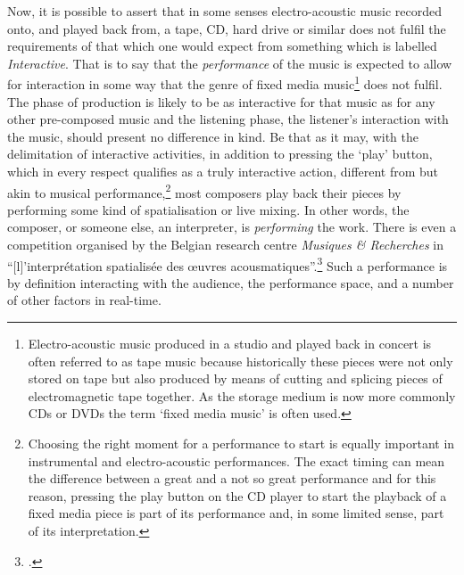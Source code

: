 Now, it is possible to assert that in some senses electro-acoustic music recorded onto, and played back from, a tape, CD, hard drive or similar does not fulfil the requirements of that which one would expect from something which is labelled \emph{Interactive}. That is to say that the \emph{performance} of the music is expected to allow for interaction in some way that the genre of  fixed media music\footnote{Electro-acoustic music produced in a studio and played back in concert is often referred to as tape music because historically these pieces were not only stored on tape but also produced by means of cutting and splicing pieces of electromagnetic tape together. As the storage medium is now more commonly CDs or DVDs the term `fixed media music' is often used.} does not fulfil. The phase of production is likely to be as interactive for that music as for any other pre-composed music and the listening phase, the listener's interaction with the music, should present no difference in kind. Be that as it may, with the delimitation of interactive activities, in addition to pressing the `play' button, which in every respect qualifies as a truly interactive action, different from but akin to musical performance,\footnote{Choosing the right moment for a performance to start is equally important in instrumental and electro-acoustic performances. The exact timing can mean the difference between a great and a not so great performance and for this reason, pressing the play button on the CD player to start the playback of a fixed media piece is part of its performance and, in some limited sense, part of its interpretation.} most composers play back their  pieces by performing some kind of spatialisation or live mixing. In other words, the composer, or someone else, an interpreter, is \emph{performing} the work. There is even a competition organised by the Belgian research centre \emph{Musiques \& Recherches} in ``[l]'interpr{\'e}tation spatialis{\'e}e des {\oe}uvres acousmatiques''.\footcite[\S~1]{concours-spat} Such a performance is by definition interacting with the audience, the performance space, and a number of other factors in real-time.

